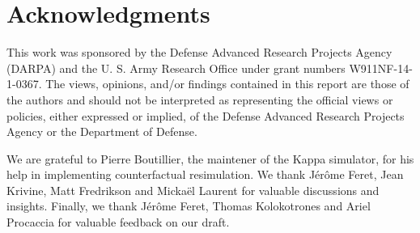 \section*{Acknowledgments}

This work was sponsored by the Defense Advanced Research Projects
Agency (DARPA) and the U. S. Army Research Office under grant numbers
W911NF-14-1-0367.  The views, opinions, and/or findings
contained in this report are those of the authors and should not be
interpreted as representing the official views or policies, either
expressed or implied, of the Defense Advanced Research Projects Agency
or the Department of Defense. 

We are grateful to Pierre Boutillier, the maintener of the Kappa
simulator, for his help in implementing counterfactual resimulation.
We thank J\'{e}r\^{o}me Feret, Jean Krivine, Matt Fredrikson and
Micka\"{e}l Laurent for valuable discussions and insights.  Finally,
we thank J\'{e}r\^{o}me Feret, Thomas Kolokotrones and Ariel Procaccia
for valuable feedback on our draft.
